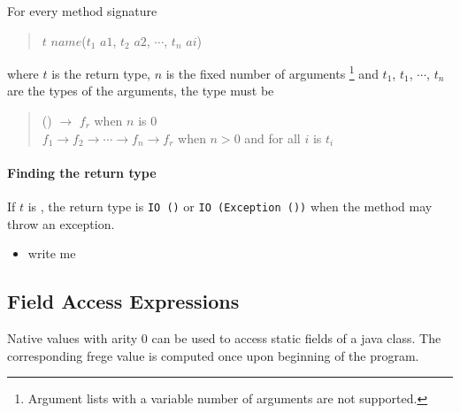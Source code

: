 For every \java{} method signature

\begin{quote}
\begin{flushleft}
$t$ $name$($t_1$ $a1$, $t_2$ $a2$, $\cdots$, $t_n$ $ai$)
\end{flushleft}
\end{quote}

where $t$ is the return type, $n$ is the fixed number of arguments
\footnote{Argument lists with a variable number of arguments are not supported.}
 and $t_1$, $t_1$, $\cdots$, $t_n$  are the types of the arguments, the \frege{} type must be

\begin{quote}
\begin{flushleft}
() $ \rightarrow{}$ $f_r$  when $n$ is 0\\
$f_1  \rightarrow{} f_2  \rightarrow{}\cdots \rightarrow{}  f_n  \rightarrow{} f_r$  when $n>0$ and for all $i$  is $t_i$\\
\end{flushleft}
\end{quote}

\paragraph{Finding the return type}

If $t$ is , the return type is \texttt{IO ()} or \texttt{IO (Exception ())} when the method may throw an exception. 

\begin{itemize}
\item write me
\end{itemize}

\subsection*{Field Access Expressions}

Native values with arity 0 can be used to access static fields of a java class. The corresponding frege value is computed once upon beginning of the program.


